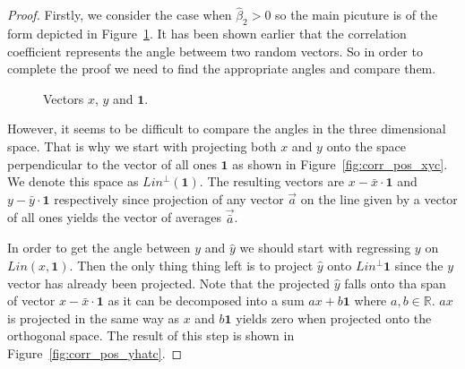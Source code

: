 \documentclass[nobib]{tufte-handout}
\begin{document}
\begin{proof}
Firstly, we consider the case when $\hat \beta_2 > 0$ so the main picuture is of the form depicted in Figure~\ref{fig:corr_pos_base}.
It has been shown earlier that the correlation coefficient represents the angle betweem two random vectors.
So in order to complete the proof we need to find the appropriate angles and compare them.

\begin{figure}[h!]
\caption{Vectors $x$, $y$ and $\mathbf{1}$.}
\label{fig:corr_pos_base}
\end{figure}

However, it seems to be difficult to compare the angles in the three dimensional space.
That is why we start with projecting both $x$ and $y$ onto the space perpendicular to the vector of all ones $\mathbf{1}$ as shown in Figure~\ref{fig:corr_pos_xyc}.
We denote this space as $Lin^{\perp}(\mathbf{1})$. The resulting vectors are $x - \bar x \cdot \mathbf{1}$  and $y - \bar y \cdot \mathbf{1}$ respectively
since projection of any vector $\vec{a}$ on the line given by a vector of all ones yields the vector of averages $\vec{\bar a}$.

In order to get the angle between $y$ and $\hat y$ we should start with regressing $y$ on $Lin(x, \mathbf{1})$.
Then the only thing thing left is to project $\hat y$ onto $Lin^{\perp}\mathbf{1}$ since the $y$ vector has already been projected.
Note that the projected $\hat y$ falls onto tha span of vector $x - \bar x \cdot \mathbf{1}$ as it can be decomposed into a sum $a x + b \mathbf{1}$ where $a, b \in \mathbb{R}$.
$a x$ is projected in the same way as $x$ and $b \mathbf{1}$ yields zero when projected onto the orthogonal space.
The result of this step is shown in Figure~\ref{fig:corr_pos_yhatc}.


\end{proof}
\end{document}

